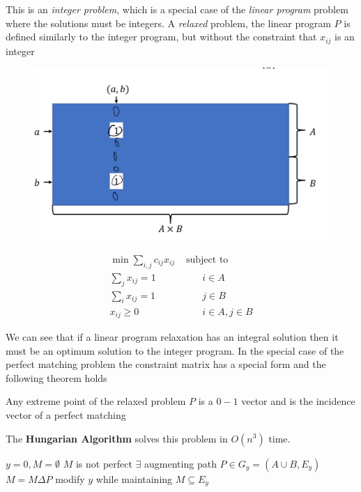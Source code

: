 \documentclass[../notes.tex]{subfiles}
\begin{document}
This is an \textit{integer problem}, which is a special case of the \textit{linear program} problem where the solutions must be integers.
A \textit{relaxed} problem, the linear program $ P $ is defined similarly to the integer program, but without the constraint that $ x_{ij} $ is an integer
\begin{figure}[H]
    \centering
    \includegraphics[width=0.8\linewidth]{img/image_2023-04-06-03-54-44.png}
\end{figure}
\begin{equation}
    \begin{split}
        \min \sum_{i, j} c_{ij} x_{ij} & \text{ subject to}  \\
         \sum_j x_{ij} = 1 &\qquad i \in A  \\
         \sum_i x_{ij} = 1 &\qquad j \in B  \\
         x_{ij} \ge  0 &\qquad i \in A, j \in B
    \end{split}
\end{equation}

We can see that if a linear program relaxation has an integral solution then it must be an optimum solution to the integer program.
In the special case of the perfect matching problem the constraint matrix has a special form and the following theorem holds


\begin{theorem}
    Any extreme point of the relaxed problem $ P $ is a $ 0-1 $ vector and is the incidence vector of a perfect matching
\end{theorem}

The \textbf{Hungarian Algorithm} solves this problem in $ O(n^3) $ time.


\begin{codebox}
\li $  y = 0, M = \emptyset$
\li \While $ M $ is not perfect \Do 
\li     \If $ \exists $ augmenting path $ P  \in  G_y = (A \cup B, E_y) $ \Then 
\li         $ M = M \Delta P $
\li     \Else
\li         modify $ y $ while maintaining $ M \subseteq E_y $ \End \End
\end{codebox}
\end{document}
